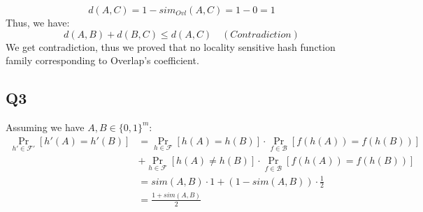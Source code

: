 \documentclass[a4paper, 12pt, titlepage]{article}
\begin{document}
\[
    d(A, C) = 1 - sim_{Ovl}(A, C) = 1 - 0 = 1
\]
Thus, we have:
\[
    d(A, B) + d(B, C) \leq d(A, C) \quad (Contradiction)
\]
We get contradiction, thus we proved that no locality sensitive hash function family corresponding to Overlap's coefficient.
\subsection{Q3}
Assuming we have $A, B \in \{0, 1\}^m$:
\begin{equation}
    \begin{aligned}
        \Pr_{h' \in \mathcal F'} \left[ h'(A) = h'(B) \right] &= \Pr_{h \in \mathcal F} \left[ h(A) = h(B) \right] \cdot \Pr_{f \in \mathcal B} \left[ f(h(A)) = f(h(B))\right] \\
                                                              &+ \Pr_{h \in \mathcal F} \left[ h(A) \neq h(B) \right] \cdot \Pr_{f \in \mathcal B} \left[ f(h(A)) = f(h(B))\right] \\
                                                              &= sim(A, B) \cdot 1 + (1 - sim(A, B)) \cdot \frac{1}{2} \\
                                                              &= \frac{1 + sim(A, B)}{2}
    \end{aligned}
\end{equation}
\end{document}
